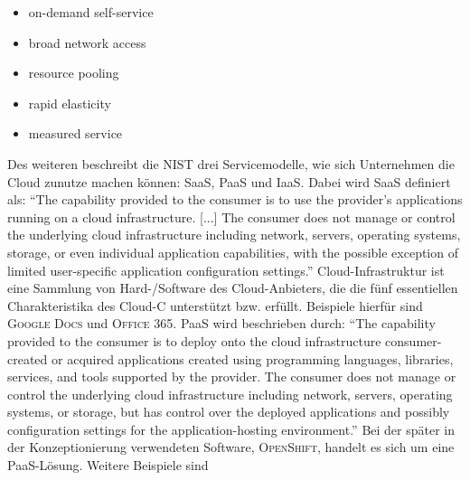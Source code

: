 \begin{itemize}
	\item on-demand self-service
	\item broad network access
	\item resource pooling
	\item rapid elasticity
	\item measured service
\end{itemize}
Des weiteren beschreibt die \ac{NIST} drei Servicemodelle, wie sich Unternehmen die Cloud zunutze machen können: \ac{SaaS}, \ac{PaaS} und \ac{IaaS}. Dabei wird \ac{SaaS} definiert als: \enquote{The capability  provided to the consumer is to use the provider’s applications running on a cloud infrastructure. [...] The consumer does not manage or control the underlying cloud infrastructure including network, servers, operating systems, storage, or even individual application capabilities, with the possible exception of limited user-specific application configuration settings.}\autocite[][S.2]{mell_nist_2011} Cloud-Infrastruktur ist eine Sammlung von Hard-/Software des Cloud-Anbieters, die die fünf essentiellen Charakteristika des \ac{Cloud-C} unterstützt bzw. erfüllt. Beispiele hierfür sind \textsc{Google Docs} und \textsc{Office 365}. \ac{PaaS} wird beschrieben durch: \enquote{The capability provided to the consumer is to deploy onto the cloud infrastructure consumer-created or acquired applications created using programming languages, libraries, services, and tools supported by the provider. The consumer does
not manage or control the underlying cloud infrastructure including network, servers, operating systems, or storage, but has control over the deployed applications and possibly configuration settings for the application-hosting environment.}\autocite[][S.2]{mell_nist_2011} Bei der später in der Konzeptionierung verwendeten Software, \textsc{OpenShift}, handelt es sich um eine \ac{PaaS}-Lösung. Weitere Beispiele sind 
